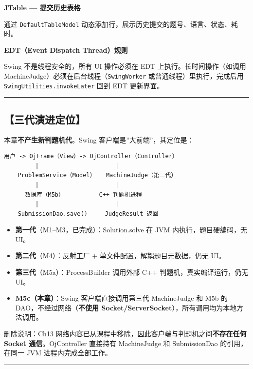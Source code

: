 \documentclass[
  11pt,
]{ctexart}
\providecommand{\tightlist}{%
  \setlength{\itemsep}{0pt}\setlength{\parskip}{0pt}}
\begin{document}
\textbf{JTable --- 提交历史表格}

通过 \texttt{DefaultTableModel}
动态添加行，展示历史提交的题号、语言、状态、耗时。

\textbf{EDT（Event Dispatch Thread）规则}

Swing 不是线程安全的，所有 UI 操作必须在 EDT 上执行。长时间操作（如调用
MachineJudge）必须在后台线程（\texttt{SwingWorker}
或普通线程）里执行，完成后用 \texttt{SwingUtilities.invokeLater} 回到
EDT 更新界面。

\begin{center}\rule{0.5\linewidth}{0.5pt}\end{center}

\hypertarget{ux4e09ux4ee3ux6f14ux8fdbux5b9aux4f4d-3}{%
\subsection{【三代演进定位】}\label{ux4e09ux4ee3ux6f14ux8fdbux5b9aux4f4d-3}}

本章\textbf{不产生新判题机代}。Swing 客户端是''大前端''，其定位是：

\begin{verbatim}
用户 -> OjFrame（View）-> OjController（Controller）
         |                      |
    ProblemService（Model）   MachineJudge（第三代）
         |                      |
      数据库（M5b）          C++ 判题机进程
         |                      |
    SubmissionDao.save()     JudgeResult 返回
\end{verbatim}

\begin{itemize}
\tightlist
\item
  \textbf{第一代}（M1--M3，已完成）：Solution.solve 在 JVM
  内执行，题目硬编码，无 UI。
\item
  \textbf{第二代}（M4）：反射工厂 + 单文件配置，解耦题目元数据，仍无
  UI。
\item
  \textbf{第三代}（M5a）：ProcessBuilder 调用外部 C++
  判题机，真实编译运行，仍无 UI。
\item
  \textbf{M5c（本章）}：Swing 客户端直接调用第三代 MachineJudge 和 M5b
  的 DAO，不经过网络（\textbf{不使用
  Socket/ServerSocket}），所有调用均为本地方法调用。
\end{itemize}

删除说明：Ch13
网络内容已从课程中移除，因此客户端与判题机之间\textbf{不存在任何 Socket
通信}。OjController 直接持有 MachineJudge 和 SubmissionDao
的引用，在同一 JVM 进程内完成全部工作。

\begin{center}\rule{0.5\linewidth}{0.5pt}\end{center}
\end{document}
